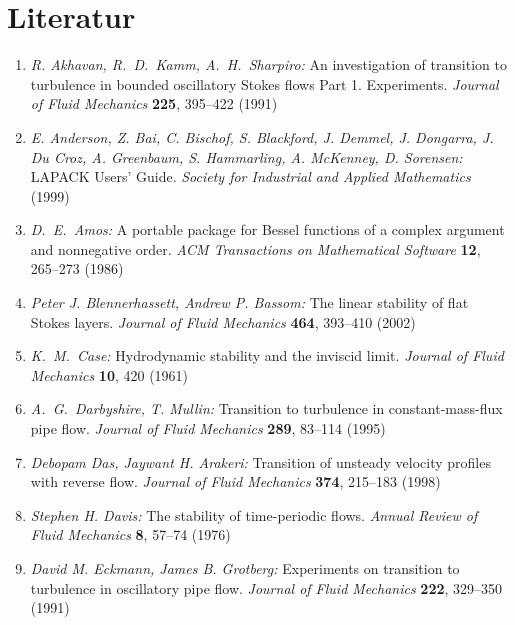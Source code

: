 \documentclass[10pt,a5paper,oneside,draft]{book}
\numberwithin{equation}{chapter}
\begin{document}
\chapter*{Literatur}\label{sec:literatur}
\pagestyle{literatur}
\newcommand{\bibfill}{\,\hrulefill\,} %
\begin{enumerate}
	\item \textsl{R. Akhavan, R.~D.~Kamm, A.~H.~Sharpiro:} An investigation of transition to turbulence in bounded oscillatory {S}tokes flows Part 1. Experiments. \textit{Journal of Fluid Mechanics} \textbf{225}, 395--422 (1991)\bibfill\pageref{bib:akhavan1}
	\item \textsl{E. Anderson, Z. Bai, C. Bischof, S. Blackford, J. Demmel, J. Dongarra, J. Du Croz, A. Greenbaum, S. Hammarling, A. McKenney, D. Sorensen:} {LAPACK} Users' Guide. \textit{Society for Industrial and Applied Mathematics} (1999)\bibfill\pageref{bib:lapack}
	\item \textsl{D.~E.~Amos:} A portable package for {B}essel functions of a complex argument and nonnegative order. \textit{ACM Transactions on Mathematical Software} \textbf{12}, 265--273 (1986)\bibfill\pageref{bib:amos}
	\item \textsl{Peter J. Blennerhassett, Andrew P. Bassom:} The linear stability of flat {S}tokes layers. \textit{Journal of Fluid Mechanics} \textbf{464}, 393--410 (2002)\bibfill\pageref{bib:blennerhassett_bassom}
	\item \textsl{K.~M.~Case:} Hydrodynamic stability and the inviscid limit. \textit{Journal of Fluid Mechanics} \textbf{10}, 420 (1961)\bibfill\pageref{bib:case2}
	\item \textsl{A.~G.~Darbyshire, T. Mullin:} Transition to turbulence in constant-mass-flux pipe flow. \textit{Journal of Fluid Mechanics} \textbf{289}, 83--114 (1995)\bibfill\pageref{bib:darbyshire_mullin}
	\item \textsl{Debopam Das, Jaywant H. Arakeri:} Transition of unsteady velocity profiles with reverse flow. \textit{Journal of Fluid Mechanics} \textbf{374}, 215--183 (1998)\bibfill\pageref{bib:das_arakeri}
	\item \textsl{Stephen H. Davis:} The stability of time-periodic flows. \textit{Annual Review of Fluid Mechanics} \textbf{8}, 57--74 (1976)\bibfill\pageref{bib:davis_review}
	\item \textsl{David M. Eckmann, James B. Grotberg:} Experiments on transition to turbulence in oscillatory pipe flow. \textit{Journal of Fluid Mechanics} \textbf{222}, 329--350 (1991)\bibfill\pageref{bib:eckmann_grotberg}

\end{enumerate}
\end{document}
